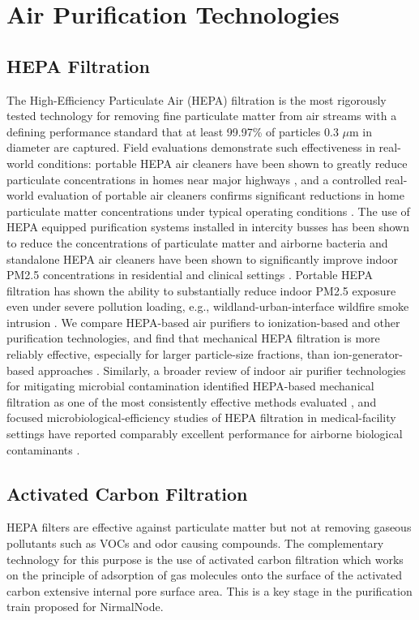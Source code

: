 \section{Air Purification Technologies}
\label{sec:lr-purification}

\subsection{HEPA Filtration}
The High-Efficiency Particulate Air (HEPA) filtration is the most rigorously tested technology for removing fine particulate matter from air streams with a defining performance standard that at least 99.97\% of particles 0.3 $\mu$m in diameter are captured. Field evaluations demonstrate such effectiveness in real-world conditions: portable HEPA air cleaners have been shown to greatly reduce particulate concentrations in homes near major highways \citep{cox2018effectiveness}, and a controlled real-world evaluation of portable air cleaners confirms significant reductions in home particulate matter concentrations under typical operating conditions \citep{lu2023realworld}. The use of HEPA equipped purification systems installed in intercity busses has been shown to reduce the concentrations of particulate matter and airborne bacteria \citep{lee2022effect} and standalone HEPA air cleaners have been shown to significantly improve indoor PM2.5 concentrations in residential and clinical settings \citep{chen2022efficacy}. Portable HEPA filtration has shown the ability to substantially reduce indoor PM2.5 exposure even under severe pollution loading, e.g., wildland-urban-interface wildfire smoke intrusion \citep{chen2025fine}. We compare HEPA-based air purifiers to ionization-based and other purification technologies, and find that mechanical HEPA filtration is more reliably effective, especially for larger particle-size fractions, than ion-generator-based approaches \citep{dubey2021assessing}. Similarly, a broader review of indoor air purifier technologies for mitigating microbial contamination identified HEPA-based mechanical filtration as one of the most consistently effective methods evaluated \citep{szczotko2022review}, and focused microbiological-efficiency studies of HEPA filtration in medical-facility settings have reported comparably excellent performance for airborne biological contaminants \citep{laine2025microbiological}.

\subsection{Activated Carbon Filtration}
HEPA filters are effective against particulate matter but not at removing gaseous pollutants such as VOCs and odor causing compounds. The complementary technology for this purpose is the use of activated carbon filtration which works on the principle of adsorption of gas molecules onto the surface of the activated carbon extensive internal pore surface area. This is a key stage in the purification train proposed for NirmalNode.

